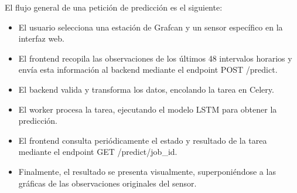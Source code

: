 El flujo general de una petición de predicción es el siguiente:

\begin{itemize}
    \item El usuario selecciona una estación de Grafcan y un sensor específico en la interfaz web.
    \item El frontend recopila las observaciones de los últimos 48 intervalos horarios y envía esta información al backend mediante el endpoint POST /predict.
    \item El backend valida y transforma los datos, encolando la tarea en Celery.
    \item El worker procesa la tarea, ejecutando el modelo LSTM para obtener la predicción.
    \item El frontend consulta periódicamente el estado y resultado de la tarea mediante el endpoint GET /predict/{job\_id}.
    \item  Finalmente, el resultado se presenta visualmente, superponiéndose a las gráficas de las observaciones originales del sensor.
\end{itemize}

